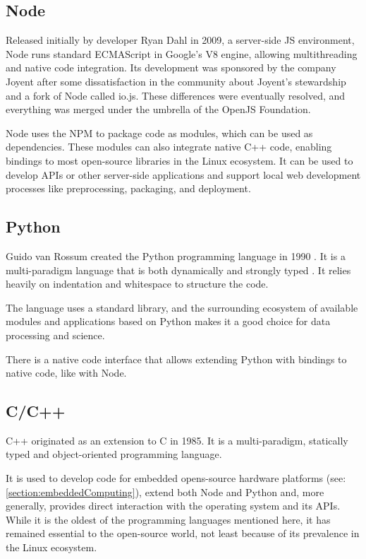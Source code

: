 \subsection{Node}

Released initially by developer Ryan Dahl in 2009, a server-side \ac{JS} environment, Node runs standard ECMAScript in Google's V8 engine, allowing multithreading and native code integration. Its development was sponsored by the company Joyent after some dissatisfaction in the community about Joyent's stewardship and a fork of Node called io.js. These differences were eventually resolved, and everything was merged under the umbrella of the OpenJS Foundation.

Node uses the \ac{NPM} to package code as modules, which can be used as dependencies. These modules can also integrate native C++ code, enabling bindings to most open-source libraries in the Linux ecosystem. It can be used to develop \ac{API}s or other server-side applications and support local web development processes like preprocessing, packaging, and deployment.

\subsection{Python}

Guido van Rossum created the Python programming language in 1990 \parencite{pythonHistory}. It is a multi-paradigm language that is both dynamically and strongly typed \parencite{pythonTyping}. It relies heavily on indentation and whitespace to structure the code.

The language uses a standard library, and the surrounding ecosystem of available modules and applications based on Python makes it a good choice for data processing and science.

There is a native code interface that allows extending Python with bindings to native code, like with Node.

\subsection{C/C++}

C++ originated as an extension to C in 1985. It is a multi-paradigm, statically typed and object-oriented programming language.

It is used to develop code for embedded opens-source hardware platforms (see: \autoref{section:embeddedComputing}), extend both Node and Python and, more generally, provides direct interaction with the operating system and its APIs. While it is the oldest of the programming languages mentioned here, it has remained essential to the open-source world, not least because of its prevalence in the Linux ecosystem.


